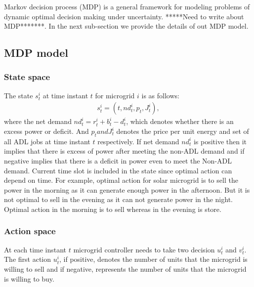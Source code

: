 Markov decision process (MDP)  is a general framework for modeling problems of dynamic optimal decision making under uncertainty. *****Need to write about MDP*******.
 In the next sub-section we provide the details of out MDP model.

\subsection{MDP model}

\subsubsection{State space}

The state $s_{t}^{i}$ at time instant $t$  for microgrid $i$ is as follows:
\begin{align}
s_{t}^{i} = (t,nd_{t}^{i},p_{t}, J_{t}^{i}),
\end{align}
where the net demand $nd_{t}^{i} = r_{t}^{i} + b_{t}^{i} - d_{t}^{i}$, which denotes whether there is an excess power or deficit.  And $p_{t} and  J_{t}^{i}$ denotes the price per unit energy and set of all ADL jobs at time instant $t$ respectively. If  net demand $nd_{t}^{i}$ is positive then it implies that there is excess of power after meeting the non-ADL demand and if negative implies that there is a deficit in power even to meet the Non-ADL demand. Current time slot is  included in the state since optimal action can depend on time. For example, optimal action for solar microgrid  is to sell the power in the morning as it can generate enough power in the afternoon. But it is not optimal to sell in the evening as it can not generate power in the night. Optimal action in the morning is to sell whereas in the evening is store.




\subsubsection{Action space}
At each time instant $t$ microgrid controller needs to take two decision $u_{t}^{i}$ and $v_{t}^{i}$. The first action $u_{t}^{i}$, if positive, denotes the number of units that the microgrid is willing to sell and if negative, represents the number of units that the microgrid is willing to buy. 

